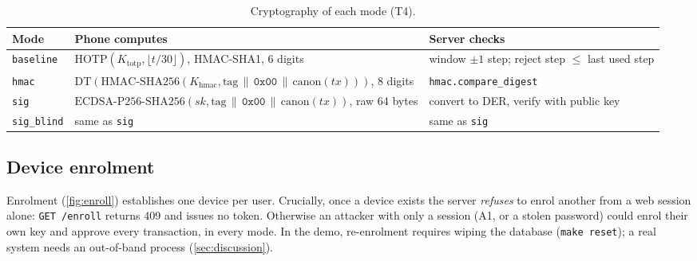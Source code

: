 \begin{table}[htbp]
\centering
\caption{Cryptography of each mode (T4).}
\label{tab:crypto}
\small
\begin{tabularx}{\linewidth}{@{}lXX@{}}
\toprule
Mode & Phone computes & Server checks \\
\midrule
\texttt{baseline} & $\mathrm{HOTP}(K_{\text{totp}},\lfloor t/30\rfloor)$, HMAC-SHA1, 6 digits & window $\pm1$ step; reject step $\le$ last used step \\
\texttt{hmac} & $\mathrm{DT}(\mathrm{HMAC\text{-}SHA256}(K_{\text{hmac}}, \text{tag}\,\|\,\texttt{0x00}\,\|\,\mathrm{canon}(tx)))$, 8 digits & \texttt{hmac.compare\_digest} \\
\texttt{sig} & $\mathrm{ECDSA\text{-}P256\text{-}SHA256}(sk, \text{tag}\,\|\,\texttt{0x00}\,\|\,\mathrm{canon}(tx))$, raw 64 bytes & convert to DER, verify with public key \\
\texttt{sig\_blind} & same as \texttt{sig} & same as \texttt{sig} \\
\bottomrule
\end{tabularx}
\end{table}

\subsection{Device enrolment}
Enrolment (\cref{fig:enroll}) establishes one device per user. Crucially, once a
device exists the server \emph{refuses} to enrol another from a web session
alone: \texttt{GET /enroll} returns 409 and issues no token. Otherwise an
attacker with only a session (A1, or a stolen password) could enrol their own
key and approve every transaction, in every mode. In the demo, re-enrolment
requires wiping the database (\texttt{make reset}); a real system needs an
out-of-band process (\cref{sec:discussion}).

